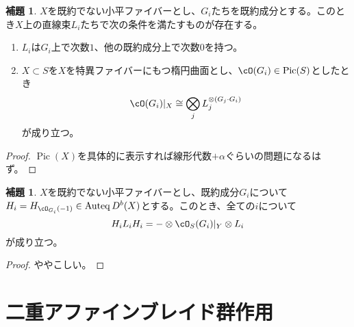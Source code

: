 \documentclass[uplatex, a4paper, dvipdfmx]{jsarticle}
\theoremstyle{definition}
\newtheorem{lemma}[theorem]{補題}
\DeclareMathOperator{\Auteq}{\mathrm{Auteq}}
\DeclareMathOperator{\Pic}{\mathrm{Pic}}
\begin{document}
\begin{lemma}
    $X$を既約でない小平ファイバーとし、$G_i$たちを既約成分とする。このとき$X$上の直線束$L_i$たちで次の条件を満たすものが存在する。
    \begin{enumerate}
        \item $L_i$は$G_i$上で次数$1$、他の既約成分上で次数$0$を持つ。
        \item $X \subset S$を$X$を特異ファイバーにもつ楕円曲面とし、$\cO(G_i) \in \Pic(S)$としたとき
              \begin{equation}
                  \cO(G_i)\vert_X \cong \bigotimes_j L_j^{\otimes (G_j\cdot G_i)}
              \end{equation}
              が成り立つ。
    \end{enumerate}
\end{lemma}
\begin{proof}
    $\Pic(X)$を具体的に表示すれば線形代数$+\alpha$ぐらいの問題になるはず。
\end{proof}

\begin{lemma}
    $X$を既約でない小平ファイバーとし、既約成分$G_i$について$H_i = H_{\cO_{G_i}(-1)} \in \Auteq D^b(X)$とする。このとき、全ての$i$について
    \begin{equation}
        H_iL_iH_i = -\otimes \cO_S(G_i)\vert_Y \otimes L_i
    \end{equation}
    が成り立つ。
\end{lemma}
\begin{proof}
    ややこしい。
\end{proof}
\section{二重アファインブレイド群作用}
\end{document}
